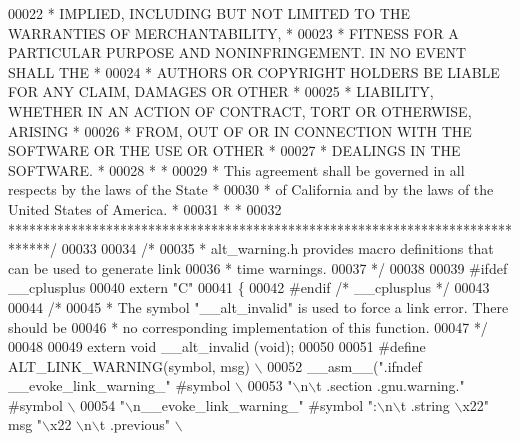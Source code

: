 \begin{DoxyCode}
00022 \textcolor{comment}{* IMPLIED, INCLUDING BUT NOT LIMITED TO THE WARRANTIES OF MERCHANTABILITY,    *}
00023 \textcolor{comment}{* FITNESS FOR A PARTICULAR PURPOSE AND NONINFRINGEMENT. IN NO EVENT SHALL THE *}
00024 \textcolor{comment}{* AUTHORS OR COPYRIGHT HOLDERS BE LIABLE FOR ANY CLAIM, DAMAGES OR OTHER      *}
00025 \textcolor{comment}{* LIABILITY, WHETHER IN AN ACTION OF CONTRACT, TORT OR OTHERWISE, ARISING     *}
00026 \textcolor{comment}{* FROM, OUT OF OR IN CONNECTION WITH THE SOFTWARE OR THE USE OR OTHER         *}
00027 \textcolor{comment}{* DEALINGS IN THE SOFTWARE.                                                   *}
00028 \textcolor{comment}{*                                                                             *}
00029 \textcolor{comment}{* This agreement shall be governed in all respects by the laws of the State   *}
00030 \textcolor{comment}{* of California and by the laws of the United States of America.              *}
00031 \textcolor{comment}{*                                                                             *}
00032 \textcolor{comment}{******************************************************************************/}
00033 
00034 \textcolor{comment}{/*}
00035 \textcolor{comment}{ * alt\_warning.h provides macro definitions that can be used to generate link }
00036 \textcolor{comment}{ * time warnings.}
00037 \textcolor{comment}{ */} 
00038 
00039 \textcolor{preprocessor}{#ifdef \_\_cplusplus}
00040 \textcolor{keyword}{extern} \textcolor{stringliteral}{"C"}
00041 \{
00042 \textcolor{preprocessor}{#endif }\textcolor{comment}{/* \_\_cplusplus */}\textcolor{preprocessor}{}
00043 
00044 \textcolor{comment}{/*}
00045 \textcolor{comment}{ * The symbol "\_\_alt\_invalid" is used to force a link error. There should be }
00046 \textcolor{comment}{ * no corresponding implementation of this function.}
00047 \textcolor{comment}{ */}  
00048 
00049 \textcolor{keyword}{extern} \textcolor{keywordtype}{void} __alt_invalid (\textcolor{keywordtype}{void});
00050 
00051 \textcolor{preprocessor}{#define ALT\_LINK\_WARNING(symbol, msg)                                                      \(\backslash\)}
00052 \textcolor{preprocessor}{  \_\_asm\_\_(".ifndef \_\_evoke\_link\_warning\_" #symbol                                          \(\backslash\)}
00053 \textcolor{preprocessor}{          "\(\backslash\)n\(\backslash\)t .section .gnu.warning." #symbol                                            \(\backslash\)}
00054 \textcolor{preprocessor}{          "\(\backslash\)n\_\_evoke\_link\_warning\_" #symbol ":\(\backslash\)n\(\backslash\)t .string \(\backslash\)x22" msg "\(\backslash\)x22 \(\backslash\)n\(\backslash\)t .previous" \(\backslash\)}

\end{DoxyCode}
